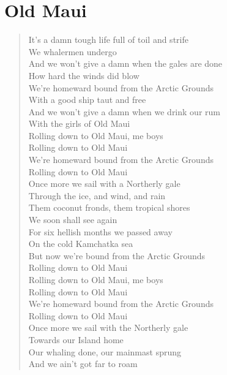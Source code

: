 \documentclass[11pt]{article}
\begin{document}
\section{Old Maui}
\label{sec:org4e352ce}
\begin{verse}
It's a damn tough life full of toil and strife\\
We whalermen undergo\\
And we won't give a damn when the gales are done\\
How hard the winds did blow\\
We're homeward bound from the Arctic Grounds\\
With a good ship taut and free\\
And we won't give a damn when we drink our rum\\
With the girls of Old Maui\\
\vspace*{1em}
Rolling down to Old Maui, me boys\\
Rolling down to Old Maui\\
We're homeward bound from the Arctic Grounds\\
Rolling down to Old Maui\\
\vspace*{1em}
Once more we sail with a Northerly gale\\
Through the ice, and wind, and rain\\
Them coconut fronds, them tropical shores\\
We soon shall see again\\
For six hellish months we passed away\\
On the cold Kamchatka sea\\
But now we're bound from the Arctic Grounds\\
Rolling down to Old Maui\\
\vspace*{1em}
Rolling down to Old Maui, me boys\\
Rolling down to Old Maui\\
We're homeward bound from the Arctic Grounds\\
Rolling down to Old Maui\\
\vspace*{1em}
Once more we sail with the Northerly gale\\
Towards our Island home\\
Our whaling done, our mainmast sprung\\
And we ain't got far to roam\\

\end{verse}
\end{document}
